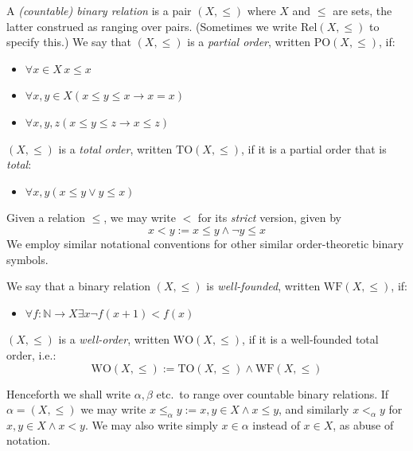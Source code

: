 \documentclass[10pt,a4paper]{amsart}
\theoremstyle{plain}
\newtheorem{fact}[fact]{Fact}
\theoremstyle{definition}
\newcommand{\anupam}[1]{\todo[color=green]{A: #1}}
\renewcommand{\todo}[1]{}
\renewcommand{\anupam}[1]{}
\theoremstyle{plain}
\theoremstyle{definition} %
\newcommand{\Nat}{\mathbb{N}}
\renewcommand{\lor}{\vee}
\renewcommand{\land}{\wedge}
\newcommand{\limp}{\to}
\newcommand{\Rel}{\mathrm{Rel}}
\newcommand{\ACA}{\mathsf{ACA}_0}
\newcommand{\WF}{\mathrm{WF}}
\newcommand{\PO}{\mathrm{PO}}
\newcommand{\TO}{\mathrm{TO}}
\newcommand{\WO}{\mathrm{WO}}
\begin{document}
A \emph{(countable) binary relation} is a pair $ (X,\leq)$ where $X$ and $\leq$ are sets, the latter construed as ranging over pairs. 
(Sometimes we write $\Rel(X,\leq)$ to specify this.)
We say that $(X,\leq)$ is a \emph{partial order}, written $\PO(X,\leq)$, if:
\begin{itemize}
    \item $\forall x \in X \, x\leq x$
    \item $\forall x,y \in X (x\leq y \leq x \limp x=x)$
    \item $\forall x,y,z (x\leq y\leq z \limp x\leq z)$
\end{itemize}

$(X,\leq)$ is a \emph{total order}, written $\TO(X,\leq)$, if it is a partial order that is \emph{total}:
\begin{itemize}
    \item $\forall x,y (x\leq y \lor y\leq x)$
\end{itemize}

Given a relation $\leq$, we may write $<$ for its \emph{strict} version, given by
\[
x<y := x\leq y \land \lnot y\leq x
\]
We employ similar notational conventions for other similar order-theoretic binary symbols.

We say that a binary relation $(X,\leq)$ is \emph{well-founded}, written $\WF(X,\leq)$, if:
\begin{itemize}
    \item $\forall f: \Nat \to X \exists x \lnot f(x+1)<f(x)$
\end{itemize}


$(X,\leq)$ is a \emph{well-order}, written $\WO(X,\leq)$, if it is a well-founded total order, i.e.:
\[
\WO(X,\leq) := \TO(X,\leq) \land \WF(X,\leq)
\]

Henceforth we shall write $\alpha,\beta$ etc.\ to range over countable binary relations.
If $\alpha = (X,\leq)$ we may write $x\leq_\alpha y := x,y \in X \land x\leq y$, and similarly $x<_\alpha y$ for $x,y\in X \land x<y$.
We may also write simply $x \in \alpha$ instead of $x \in X$, as abuse of notation.
\end{document}
